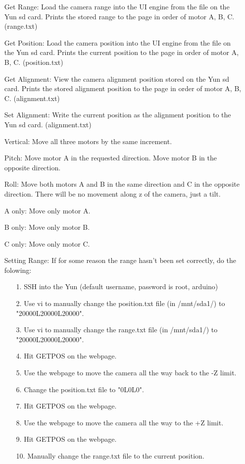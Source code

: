 \documentclass[11pt]{article}
\begin{document}
\begin{enumerate}
	\item[Get Range:] Load the camera range into the UI engine from the file on the Yun sd card.  Prints the stored range to the page in order of motor A, B, C. (range.txt)
	\item[Get Position:] Load the camera position into the UI engine from the file on the Yun sd card. Prints the current position to the page in order of motor A, B, C. (position.txt)
	\item[Get Alignment:] View the camera alignment position stored on the Yun sd card. Prints the stored alignment position to the page in order of motor A, B, C. (alignment.txt)
	\item[Set Alignment:] Write the current position as the alignment position to the Yun sd card. (alignment.txt)
	\item[Vertical:] Move all three motors by the same increment.
	\item[Pitch:] Move motor A in the requested direction. Move motor B in the opposite direction.
	\item[Roll:] Move both motors A and B in the same direction and C in the opposite direction.  There will be no movement along z of the camera, just a tilt.
	\item[A only:] Move only motor A.
	\item[B only:] Move only motor B.
	\item[C only:] Move only motor C.
	
	\item[Setting Range:] If for some reason the range hasn't been set correctly, do the folowing:
	\begin{enumerate} 
		\item[1.]SSH into the Yun (default username, password is root, arduino)
		\item[2.]Use vi to manually change the position.txt file (in /mnt/sda1/) to "20000L20000L20000".
		\item[3.]Use vi to manually change the range.txt file (in /mnt/sda1/) to "20000L20000L20000".
		\item[4.]Hit GETPOS on the webpage.
		\item[5.]Use the webpage to move the camera all the way back to the -Z limit.
		\item[6.]Change the position.txt file to "0L0L0".
		\item[7.]Hit GETPOS on the webpage.
		\item[8.]Use the webpage to move the camera all the way to the +Z limit.
		\item[9.]Hit GETPOS on the webpage.
		\item[10.]Manually change the range.txt file to the current position.
	\end{enumerate}
\end{enumerate}
\end{document}
